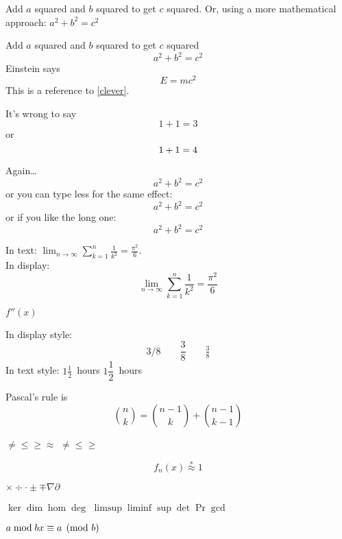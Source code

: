 \documentclass{article}
\begin{document}
	Add $a$ squared and $b$ squared
	to get $c$ squared. Or, using
	a more mathematical approach:
	$a^2 + b^2 = c^2$
	
	Add $a$ squared and $b$ squared
	to get $c$ squared
	\begin{equation}
	a^2 + b^2 = c^2
	\end{equation}
	Einstein says
	\begin{equation}
	E = mc^2 \label{clever}
	\end{equation}
	This is a reference to
	\eqref{clever}.
	
	
	It’s wrong to say
	\begin{equation}
	1 + 1 = 3 \tag{dumb}
	\end{equation}
	or
	\begin{equation}
	1 + 1 = 4 \notag
	\end{equation}
	
	
	Again\ldots
	\begin{equation*}
	a^2 + b^2 = c^2
	\end{equation*}
	or you can type less for the
	same effect:
	\[ a^2 + b^2 = c^2 \]
	or if you like the long one:
	\begin{displaymath}
	a^2 + b^2 = c^2
	\end{displaymath}
	
	
	In text:
	$\lim_{n \to \infty}
	\sum_{k=1}^n \frac{1}{k^2}
	= \frac{\pi^2}{6}$.\\
	In display:
	\[
	\lim_{n \to \infty}
	\sum_{k=1}^n \frac{1}{k^2}
	= \frac{\pi^2}{6}
	\]
	
	
	$f''(x)$
	
	In display style:
	\[
	3/8 \qquad \frac{3}{8}
	\qquad \tfrac{3}{8}
	\]
	In text style:
	$1\frac{1}{2}$~hours \qquad
	$1\dfrac{1}{2}$~hours
	
	
	Pascal’s rule is
	\[
	\binom{n}{k} =\binom{n-1}{k}
	+ \binom{n-1}{k-1}
	\]
	
	$\ne  \le \ge \approx$
	$\neq \leq \geq$
	
	\[
	f_n(x) \stackrel{*}{\approx} 1
	\]
	
	$\times \div \cdot \pm \mp \nabla \partial$
	
	$\ker \dim \hom \deg$
	$\limsup \liminf \sup \det \Pr \gcd$
	
	$a\bmod b\\
	x\equiv a\pmod{b}$
	
\end{document}
